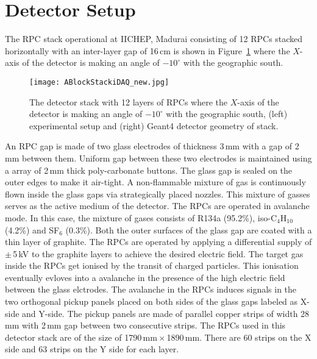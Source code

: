 \section{Detector Setup} \label{sec:detectorA}
The RPC stack operational at IICHEP, Madurai consisting of 12 RPCs
stacked horizontally with an inter-layer gap of 16\,cm is shown in
Figure~\ref{fig:stack} where the $X$-axis of the detector is making an
angle of $-10^\circ$ with the geographic south.
\begin{figure}[h]
  \centering
  \texttt{[image: ABlockStackiDAQ\_new.jpg]} 
  \caption{The detector stack with 12 layers of RPCs where the
    $X$-axis of the detector is making an angle of $-10^\circ$ with
    the geographic south, (left) experimental setup and (right) Geant4
    detector geometry of stack.}
  \label{fig:stack}
\end{figure}
An RPC gap is made of two glass electrodes of thickness 3\,mm with
a gap of 2\,mm between them. Uniform gap between these two electrodes
is maintained using a array of 2\,mm thick poly-carbonate buttons.
The glass gap is sealed on the outer edges to make it air-tight.
A non-flammable mixture of gas is continuously
flown inside the glass gaps via strategically placed nozzles.
This mixture of gasses serves as the active medium of the detector.
The RPCs are operated in avalanche mode. In this case, the mixture of
gases consists of R134a (95.2\%), iso-C$_4$H$_{10}$ (4.2\%) and
SF$_6$ (0.3\%). Both the outer surfaces of the glass gap are coated
with a thin layer of graphite. The RPCs are operated by applying
a differential supply of $\pm$\,5\,kV to the graphite layers to
achieve the desired electric field. The target gas inside the RPCs get
ionised by the transit of charged particles. This ionisation eventually
evloves into a avalanche in the presence of the high electric field
between the glass elctrodes. The avalanche in the RPCs induces
signals in the two orthogonal pickup panels placed on both sides of
the glass gaps labeled as X-side and Y-side. The pickup
panels are made of parallel copper strips of width 28\,mm with 2\,mm
gap between two consecutive strips. The RPCs used in this detector
stack are of the size of 1790\,mm\,$\times$\,1890\,mm. There are
60 strips on the X side and 63 strips on the Y side for each layer.

